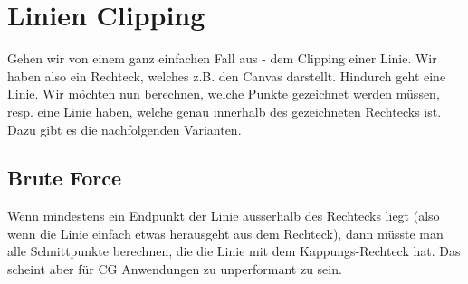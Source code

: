 \section{Linien Clipping}
Gehen wir von einem ganz einfachen Fall aus - dem Clipping einer Linie. Wir haben also ein Rechteck, welches z.B. den Canvas darstellt. Hindurch geht eine Linie. Wir möchten nun berechnen, welche Punkte gezeichnet werden müssen, resp. eine Linie haben, welche genau innerhalb des gezeichneten Rechtecks ist. Dazu gibt es die nachfolgenden Varianten.

\subsection{Brute Force}
Wenn mindestens ein Endpunkt der Linie ausserhalb des Rechtecks liegt (also wenn die Linie einfach etwas herausgeht aus dem Rechteck), dann müsste man alle Schnittpunkte berechnen, die die Linie mit dem Kappungs-Rechteck hat. Das scheint aber für CG Anwendungen zu unperformant zu sein.

